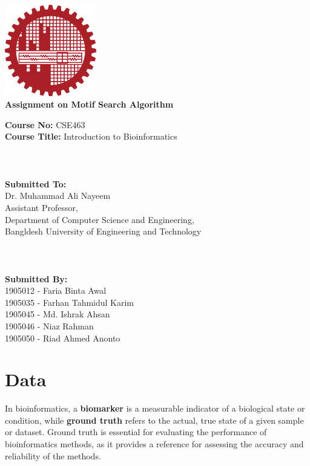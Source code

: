 \documentclass{article}
\begin{document}
\newpage
\begin{Large}
\begin{center}
\includegraphics[width=0.3\textwidth]{logo/buet.png}\\

\textbf{{\huge Assignment on Motif Search Algorithm}}
\end{center}
\textbf{Course No:} CSE463\\
\textbf{Course Title:} Introduction to Bioinformatics
\\
\\
\\
\\
\textbf{Submitted To:}\\
Dr. Muhammad Ali Nayeem\\
Assistant Professor,\\
Department of Computer Science and Engineering,\\
Bangldesh University of Engineering and Technology
\\
\\
\\
\\
\textbf{Submitted By:}\\
1905012 - Faria Binta Awal\\
1905035 - Farhan Tahmidul Karim\\
1905045 - Md. Ishrak Ahsan\\
1905046 - Niaz Rahman\\
1905050 - Riad Ahmed Anonto\\

\newpage
\tableofcontents
\newpage

\section{Data}
In bioinformatics, a \textbf{biomarker} is a measurable indicator of a biological state or condition, while \textbf{ground truth} refers to the actual, true state of a given sample or dataset. Ground truth is essential for evaluating the performance of bioinformatics methods, as it provides a reference for assessing the accuracy and reliability of the methods.\\


\end{Large}
\end{document}
